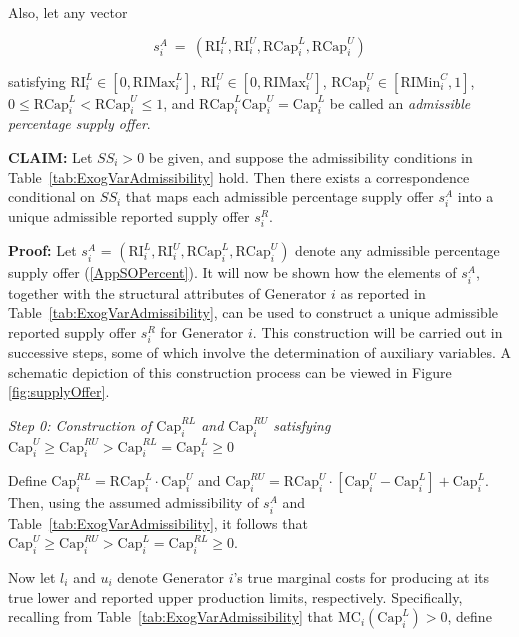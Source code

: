 \documentclass[12pt]{article}
\begin{document}
\noindent
Also, let any vector 

\begin{equation} \label{AppSOPercent}
s^A_i ~=~ (\mbox{RI}^L_i, \mbox{RI}^U_i, \mbox{RCap}^L_i, \mbox{RCap}^U_i)               
\end{equation}

\noindent
satisfying $\mbox{RI}_i^L \in [0,\mbox{RIMax}^L_i]$, 
$\mbox{RI}_i^U \in [0,\mbox{RIMax}^U_i]$, 
$\mbox{RCap}^U_i \in [\mbox{RIMin}^C_i,1]$,  
$0 \le \mbox{RCap}_i^L < \mbox{RCap}_i^U \le 1$, 
and $\mbox{RCap}^L_i\mbox{Cap}^U_i = \mbox{Cap}^L_i$
be called an \textit{admissible percentage supply offer\/}.
          

\bigskip
\noindent\textbf{CLAIM:}  Let $SS_i > 0$ be given, and suppose the admissibility conditions in Table~\ref{tab:ExogVarAdmissibility} hold.   Then there exists a correspondence conditional on $SS_i$ that maps each admissible percentage supply offer $s^A_i$ into a unique admissible reported supply offer $s^R_i$.


\textbf{Proof:\/} Let $s^A_i$ =  $(\mbox{RI}^L_i, \mbox{RI}^U_i, \mbox{RCap}^L_i, \mbox{RCap}^U_i)$ denote any admissible percentage supply offer (\ref{AppSOPercent}).  It will now be shown how the elements of $s^A_i$, together with the structural attributes of Generator $i$ as reported in Table~\ref{tab:ExogVarAdmissibility},
can be used to construct a unique admissible reported supply offer $s^R_i$ for Generator $i$.  This construction will be carried out in successive steps, some of which involve the determination of auxiliary variables.  A schematic depiction of this construction process can be viewed in Figure \ref{fig:supplyOffer}.


\bigskip
\noindent\textit{Step 0: Construction of $\mbox{Cap}_i^{RL}$ and $\mbox{Cap}^{RU}_i$ satisfying 
$\mbox{Cap}^{U}_i \ge \mbox{Cap}^{RU}_i > \mbox{Cap}^{RL}_i = \mbox{Cap}^{L}_i \ge 0$}

\medskip
Define $\mbox{Cap}^{RL}_i = \mbox{RCap}_i^{L} \cdot \mbox{Cap}^{U}_i$ and
$\mbox{Cap}_i^{RU} = \mbox{RCap}_i^{U} \cdot [\mbox{Cap}_{i}^U -  \mbox{Cap}_{i}^L ] + \mbox{Cap}_{i}^L$. 
Then, using the assumed admissibility of $s^A_i$ and Table~\ref{tab:ExogVarAdmissibility}, 
it follows that $\mbox{Cap}^U_i \ge \mbox{Cap}_i^{RU}  >  \mbox{Cap}^{L}_i = \mbox{Cap}^{RL}_i  \ge  0$.

\bigskip
Now let $l_i$ and $u_i$ denote Generator $i$'s true marginal costs for producing at its true lower and reported upper production limits, respectively.  Specifically, recalling from Table~\ref{tab:ExogVarAdmissibility}
that $\mbox{MC}_i(\mbox{Cap}^L_i) > 0$, define
\end{document}
